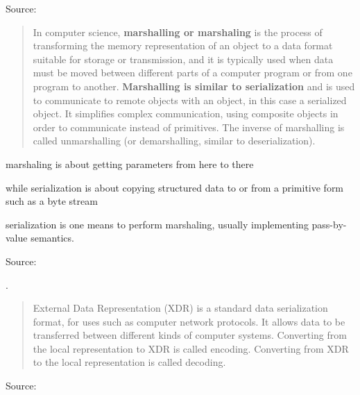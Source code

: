 \documentclass[Screen16to9,17pt]{foils}
\begin{document}
Source: {\footnotesize\\
}




\begin{quote}
In computer science, {\bf marshalling or marshaling} is the process of transforming the memory representation of an object to a data format suitable for storage or transmission, and it is typically used when data must be moved between different parts of a computer program or from one program to another. {\bf Marshalling is similar to serialization} and is used to communicate to remote objects with an object, in this case a serialized object. It simplifies complex communication, using composite objects in order to communicate instead of primitives. The inverse of marshalling is called unmarshalling (or demarshalling, similar to deserialization).
\end{quote}

\begin{list2}
  \item marshaling is about getting parameters from here to there
  \item while serialization is about copying structured data to or from a primitive form such as a byte stream
  \item serialization is one means to perform marshaling, usually implementing pass-by-value semantics.
\end{list2}

Source: {\footnotesize\\
}


.

\begin{quote}
External Data Representation (XDR) is a standard data serialization format, for uses such as computer network protocols. It allows data to be transferred between different kinds of computer systems. Converting from the local representation to XDR is called encoding. Converting from XDR to the local representation is called decoding.
\end{quote}

Source: {\footnotesize\\
}
\end{document}
